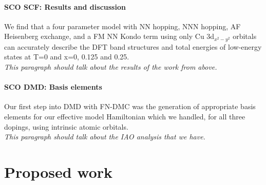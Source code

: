 \documentclass{article}
\begin{document}
\paragraph{SCO SCF: Results and discussion} We find that a four parameter model with NN hopping, NNN hopping, AF Heisenberg exchange, and a FM NN Kondo term using only Cu 3d$_{x^2-y^2}$ orbitals can accurately describe the DFT band structures and total energies of low-energy states at T=0 and x=0, 0.125 and 0.25.
\\
\textit{This paragraph should talk about the results of the work from above.}

\paragraph{SCO DMD: Basis elements} Our first step into DMD with FN-DMC was the generation of appropriate basis elements for our effective model Hamiltonian which we handled, for all three dopings, using intrinsic atomic orbitals.
\\
\textit{This paragraph should talk about the IAO analysis that we have.}



\pagebreak

\section{Proposed work}
\end{document}
